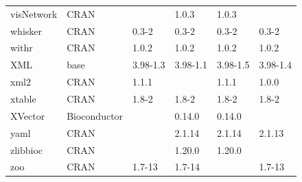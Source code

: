 \begin{longtable}{llllll}
\rowcolor{black!5}
visNetwork                    & \acrshort{CRAN}                      &             & 1.0.3       & 1.0.3          &                    \\
\rowcolor{black!10}
whisker                       & \acrshort{CRAN}                      & 0.3-2       & 0.3-2       & 0.3-2          & 0.3-2             \\
\rowcolor{black!5}
withr                         & \acrshort{CRAN}                      & 1.0.2       & 1.0.2       & 1.0.2          & 1.0.2              \\
\rowcolor{black!10}
XML                           & base                      & 3.98-1.3    & 3.98-1.1    & 3.98-1.5       & 3.98-1.4          \\
\rowcolor{black!5}
xml2                          & \acrshort{CRAN}                      & 1.1.1       &             & 1.1.1          & 1.0.0              \\
\rowcolor{black!10}
xtable                        & \acrshort{CRAN}                      & 1.8-2       & 1.8-2       & 1.8-2          & 1.8-2             \\
\rowcolor{black!5}
XVector                       & Bioconductor              &             & 0.14.0      & 0.14.0         &                    \\
\rowcolor{black!10}
yaml                          & \acrshort{CRAN}                      &             & 2.1.14      & 2.1.14         & 2.1.13            \\
\rowcolor{black!5}
zlibbioc                      & \acrshort{CRAN}                      &             & 1.20.0      & 1.20.0         &                    \\
\rowcolor{black!10}
zoo                           & \acrshort{CRAN}                      & 1.7-13      & 1.7-14      &                & 1.7-13            \\
\hline
\end{longtable}
